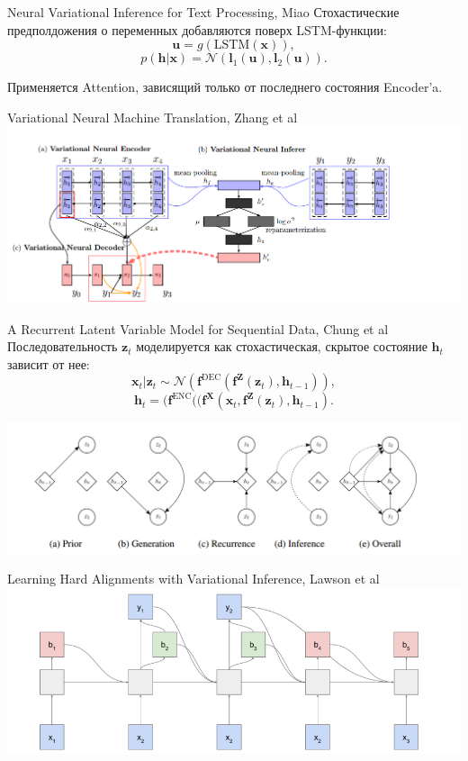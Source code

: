 \documentclass[10pt,pdf,utf8,russian,aspectratio=169]{beamer}
\begin{document}
\begin{frame}{Neural Variational Inference for Text Processing, Miao}
Стохастические предполдожения о переменных добавляются поверх LSTM-функции:
\[
\mathbf{u} = g (\text{LSTM}(\mathbf{x})),
\]
\[
p(\mathbf{h}|\mathbf{x}) =  \mathcal{N}(\mathbf{l}_1(\mathbf{u}), \mathbf{l}_2(\mathbf{u})).
\]

Применяется Attention, зависящий только от последнего состояния Encoder'a.
\end{frame}


\begin{frame}{Variational Neural Machine Translation, Zhang et al}
\includegraphics[width=\textwidth]{mt.png}
\end{frame}

\begin{frame}{A Recurrent Latent Variable Model for Sequential Data, Chung et al}
Последовательность $\mathbf{z}_t$ моделируется как стохастическая, скрытое состояние $\mathbf{h}_t$ зависит от нее:
\[
\mathbf{x}_t|\mathbf{z}_t \sim \mathcal{N}(\mathbf{f}^\text{DEC}(\mathbf{f}^\mathbf{Z} (\mathbf{z}_t), \mathbf{h}_{t-1})),
\]
\[
    \mathbf{h}_t = (\mathbf{f}^\text{ENC}((\mathbf{f}^\mathbf{X}(\mathbf{x}_t, \mathbf{f}^\mathbf{Z} (\mathbf{z}_t), \mathbf{h}_{t-1}).
\]

\includegraphics[width=\textwidth]{latent.png}

\end{frame}

\begin{frame}{Learning Hard Alignments with Variational Inference, Lawson et al}
\includegraphics[width=\textwidth]{hard.png}
\end{frame}
\end{document}
